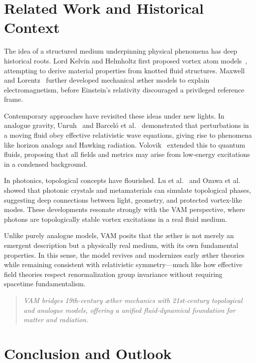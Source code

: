\section{Related Work and Historical Context}

The idea of a structured medium underpinning physical phenomena has deep historical roots. Lord Kelvin and Helmholtz first proposed vortex atom models~\cite{thomson1867}, attempting to derive material properties from knotted fluid structures. Maxwell~\cite{maxwell1861} and Lorentz~\cite{lorentz1904} further developed mechanical æther models to explain electromagnetism, before Einstein's relativity discouraged a privileged reference frame.

Contemporary approaches have revisited these ideas under new lights. In analogue gravity, Unruh~\cite{unruh1981} and Barceló et al.~\cite{barcelo2011} demonstrated that perturbations in a moving fluid obey effective relativistic wave equations, giving rise to phenomena like horizon analogs and Hawking radiation. Volovik~\cite{volovik2003} extended this to quantum fluids, proposing that all fields and metrics may arise from low-energy excitations in a condensed background.

In photonics, topological concepts have flourished. Lu et al.~\cite{lu2014} and Ozawa et al.~\cite{ozawa2019} showed that photonic crystals and metamaterials can simulate topological phases, suggesting deep connections between light, geometry, and protected vortex-like modes. These developments resonate strongly with the VAM perspective, where photons are topologically stable vortex excitations in a real fluid medium.

Unlike purely analogue models, VAM posits that the æther is not merely an emergent description but a physically real medium, with its own fundamental properties. In this sense, the model revives and modernizes early æther theories while remaining consistent with relativistic symmetry—much like how effective field theories respect renormalization group invariance without requiring spacetime fundamentalism.

\begin{quote}
    \emph{VAM bridges 19th-century æther mechanics with 21st-century topological and analogue models, offering a unified fluid-dynamical foundation for matter and radiation.}
\end{quote}


\section{Conclusion and Outlook}

